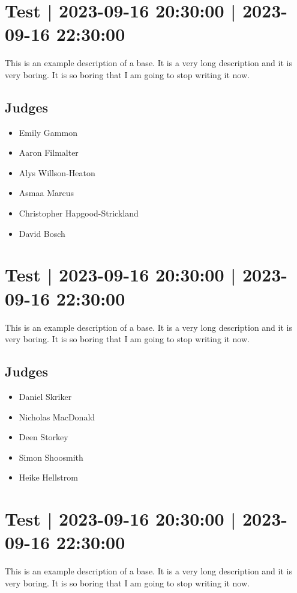 \documentclass[10pt]{article}
\begin{document}
			\setcounter{section}{22}
	\section{Test | 2023-09-16 20:30:00 | 2023-09-16 22:30:00}
	This is an example description of a base. It is a very long description and it is very boring. It is so boring that I am going to stop writing it now.

	\subsection*{Judges}
	\begin{itemize}

			\item Emily Gammon
			\item Aaron Filmalter
			\item Alys Willson-Heaton
			\item Asmaa Marcus
			\item Christopher Hapgood-Strickland
			\item David Bosch
		\end{itemize}

			\setcounter{section}{23}
	\section{Test | 2023-09-16 20:30:00 | 2023-09-16 22:30:00}
	This is an example description of a base. It is a very long description and it is very boring. It is so boring that I am going to stop writing it now.

	\subsection*{Judges}
	\begin{itemize}

			\item Daniel Skriker
			\item Nicholas MacDonald
			\item Deen Storkey
			\item Simon Shoosmith
			\item Heike Hellstrom
		\end{itemize}

			\setcounter{section}{24}
	\section{Test | 2023-09-16 20:30:00 | 2023-09-16 22:30:00}
	This is an example description of a base. It is a very long description and it is very boring. It is so boring that I am going to stop writing it now.
\end{document}

